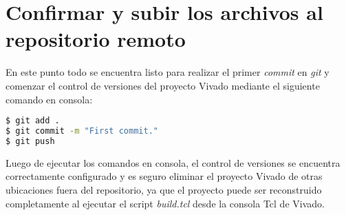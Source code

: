 \section{Confirmar y subir los archivos al repositorio remoto}

	En este punto todo se encuentra listo para realizar el primer \textit{commit} en \textit{git} y comenzar el control de versiones del proyecto Vivado mediante el siguiente comando en consola:
	
\begin{lstlisting}[language=bash, frame=single]
$ git add .
$ git commit -m "First commit."
$ git push

\end{lstlisting}

	Luego de ejecutar los comandos en consola, el control de versiones se encuentra correctamente configurado y es seguro eliminar el proyecto Vivado de otras ubicaciones fuera del repositorio, ya que el proyecto puede ser reconstruido completamente al ejecutar el script \textit{ build.tcl} desde la consola Tcl de Vivado.